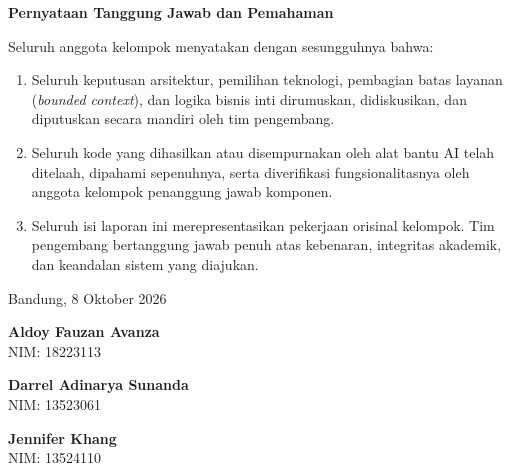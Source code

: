\begin{small}
\begin{singlespacing}
\vspace{0.3cm}
\noindent\textbf{\large Pernyataan Tanggung Jawab dan Pemahaman}\par
\vspace{0.1cm}
Seluruh anggota kelompok menyatakan dengan sesungguhnya bahwa:
\begin{enumerate}[noitemsep, topsep=1pt, parsep=0pt]
    \item Seluruh keputusan arsitektur, pemilihan teknologi, pembagian batas layanan (\textit{bounded context}), dan logika bisnis inti dirumuskan, didiskusikan, dan diputuskan secara mandiri oleh tim pengembang.
    \item Seluruh kode yang dihasilkan atau disempurnakan oleh alat bantu AI telah ditelaah, dipahami sepenuhnya, serta diverifikasi fungsionalitasnya oleh anggota kelompok penanggung jawab komponen.
    \item Seluruh isi laporan ini merepresentasikan pekerjaan orisinal kelompok. Tim pengembang bertanggung jawab penuh atas kebenaran, integritas akademik, dan keandalan sistem yang diajukan.
\end{enumerate}

\vspace{0.3cm}

\begin{center}
Bandung, 8 Oktober 2026
\end{center}
\vspace{0.8cm}

\noindent
\begin{minipage}[t]{0.32\textwidth}
\centering
\textbf{Aldoy Fauzan Avanza}\\
NIM: 18223113
\end{minipage}\hfill
\begin{minipage}[t]{0.32\textwidth}
\centering
\textbf{Darrel Adinarya Sunanda}\\
NIM: 13523061
\end{minipage}\hfill
\begin{minipage}[t]{0.32\textwidth}
\centering
\textbf{Jennifer Khang}\\
NIM: 13524110
\end{minipage}
\end{singlespacing}
\end{small}
